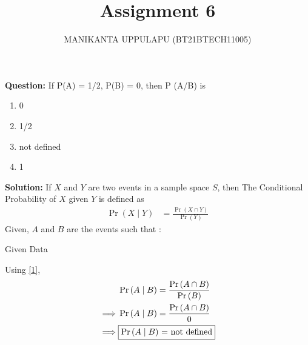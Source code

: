 \documentclass[journal,12pt,twocolumn]{IEEEtran}
\title{Assignment 6}
\author{MANIKANTA UPPULAPU (BT21BTECH11005)}
\providecommand{\pr}[1]{\ensuremath{\Pr\left(#1\right)}}
\newcommand{\question}{\noindent \textbf{Question: }}
\newcommand{\solution}{\noindent \textbf{Solution: }}
\begin{document}
    \maketitle  
    
    \question If P(A) = 1/2, P(B) = 0, then P (A/B) is
    \begin{enumerate}
        \item 0 
        \item 1/2
        \item not defined
        \item 1
    \end{enumerate}
    
    \solution 
     If $X$ and $Y$ are two events in a sample space $S$, then The Conditional Probability of $X$ given $Y$ is defined as
        \begin{align}
        \label{1}  \pr{X \mid Y} &= \frac{\pr{X \cap Y}}{\pr{Y}}  
        \end{align}
        Given, $A$ and $B$ are the events such that :
        \begin{table}[ht!]
        \centering
           
        \caption{Given Data}
	        \label{Tables:Table}
        \end{table}
        \begin{enumerate}
             Using \eqref{1},
            \begin{align}
                &\pr{A \mid B} = \frac{\pr{A \cap B}}{\pr{B}}\label{2} \\
                \implies &\pr{A \mid B} = \frac{{\pr{A \cap B}}}{{0}}\label{3} \\
                \implies &\fbox{\pr{A \mid B} = \text{not defined}}\label{4} 
            \end{align}
            \end{enumerate}
            
\end{document}

